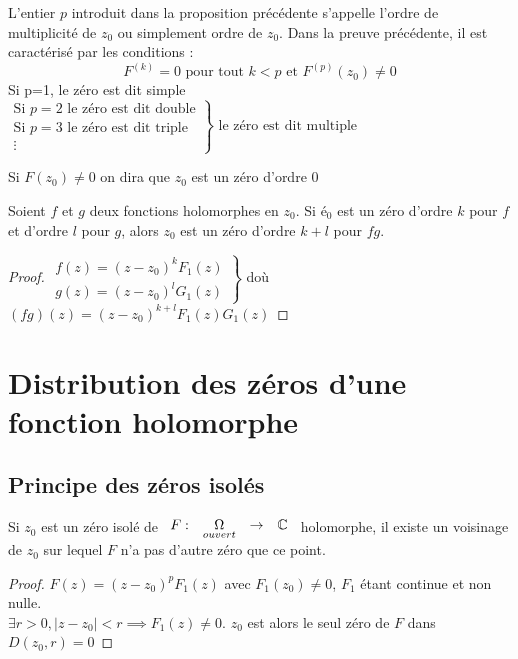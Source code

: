 \documentclass[]{report}
\begin{document}
L'entier $p$ introduit dans la proposition précédente s'appelle l'ordre de multiplicité de $z_0$ ou simplement ordre de $z_0$. Dans la preuve précédente, il est caractérisé par les conditions :\\
$$F^{(k)}=0\text{ pour tout }k<p \text{ et }F^{(p)}(z_0)\neq 0$$
     Si p=1, le zéro est dit simple\\
$\left.\begin{array}{ll}
 \text{Si }p=2\text{ le zéro est dit double}\\  
 \text{Si }p=3\text{ le zéro est dit triple}\\
 \vdots\end{array}\right\} \text{ le zéro est dit multiple}$

\begin{nt}[Convention]
    Si $F(z_0)\neq 0$ on dira que $z_0$ est un zéro d'ordre $0$
\end{nt}

\begin{lm}
    Soient $f$ et $g$ deux fonctions holomorphes en $z_0$. Si $é_0$ est un zéro d'ordre $k$ pour $f$ et d'ordre $l$ pour $g$, alors $z_0$ est un zéro d'ordre $k+l$ pour $fg$.
\end{lm}

\begin{proof}
    $\left.\begin{array}{ll}
        f(z)=(z-z_0)^kF_1(z)\\
        g(z)=(z-z_0)^lG_1(z)
    \end{array}\right\}$ doù $(fg)(z)=(z-z_0)^{k+l}F_1(z)G_1(z)$
\end{proof}

\section{Distribution des zéros d'une fonction holomorphe}

\subsection{Principe des zéros isolés}

\begin{lm}
    Si $z_0$ est un zéro isolé de $\begin{array}{ccccc} F : & \underset{ouvert}{\Omega} & \to & \mathbb{C} \end{array}$ holomorphe, il existe un voisinage de $z_0$ sur lequel $F$ n'a pas d'autre zéro que ce point.
\end{lm}

\begin{proof}
    $F(z)=(z-z_0)^pF_1(z)$ avec $F_1(z_0)\neq 0$, $F_1$ étant continue et non nulle.\\
    $\exists r>0,|z-z_0|<r\implies F_1(z)\neq 0$. $z_0$ est alors le seul zéro de $F$ dans $D(z_0,r)=0$
\end{proof}
\end{document}
